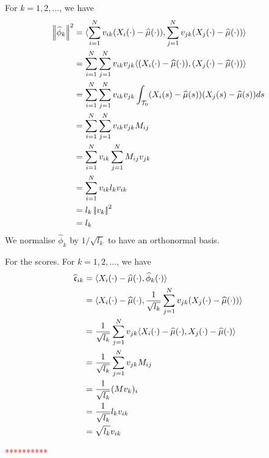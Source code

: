 For $k = 1, 2, \dots$, we have
\begin{align*}
\left|\!\left|\widehat{\phi}_k\right|\!\right|^2 &= \langle\sum_{i = 1}^N v_{ik}(X_i(\cdot) - \widehat{\mu}(\cdot)), \sum_{j = 1}^N v_{jk}(X_j(\cdot) - \widehat{\mu}(\cdot))\rangle \\
    &= \sum_{i = 1}^N \sum_{j = 1}^N v_{ik} v_{jk}\langle(X_i(\cdot) - \widehat{\mu}(\cdot)), (X_j(\cdot) - \widehat{\mu}(\cdot))\rangle \\
    &= \sum_{i = 1}^N \sum_{j = 1}^N v_{ik} v_{jk} \int_{\mathcal{T}_{0}} (X_i(s) - \widehat{\mu}(s))(X_j(s) - \widehat{\mu}(s))ds \\
    &= \sum_{i = 1}^N \sum_{j = 1}^N v_{ik} v_{jk} M_{ij} \\
    &= \sum_{i = 1}^N v_{ik} \sum_{j = 1}^N M_{ij} v_{jk} \\
    &= \sum_{i = 1}^N v_{ik} l_k v_{ik} \\
    &= l_k \left|\!\left|v_k\right|\!\right|^2 \\
    &= l_k
\end{align*}
We normalise $\widehat{\phi}_k$ by $1 / \sqrt{l_k}$ to have an orthonormal basis.


For the scores. For $k = 1, 2, \dots$, we have
\begin{align}
    \widehat{\mathfrak{c}}_{ik} &= \langle X_i(\cdot) - \widehat{\mu}(\cdot), \widehat{\phi}_k(\cdot)\rangle \\
    &= \langle X_i(\cdot) - \widehat{\mu}(\cdot), \frac{1}{\sqrt{l_k}}\sum_{j = 1}^N v_{jk}(X_j(\cdot) - \widehat{\mu}(\cdot))\rangle \\
    &= \frac{1}{\sqrt{l_k}}\sum_{j = 1}^N v_{jk} \langle X_i(\cdot) - \widehat{\mu}(\cdot), X_j(\cdot) - \widehat{\mu}(\cdot)\rangle \\
    &= \frac{1}{\sqrt{l_k}}\sum_{j = 1}^N v_{jk}M_{ij} \\
    &= \frac{1}{\sqrt{l_k}}(Mv_k)_i \\
    &= \frac{1}{\sqrt{l_k}}l_kv_{ik} \\
    &= \sqrt{l_k}v_{ik}
\end{align}

\textcolor{red}{**********}

